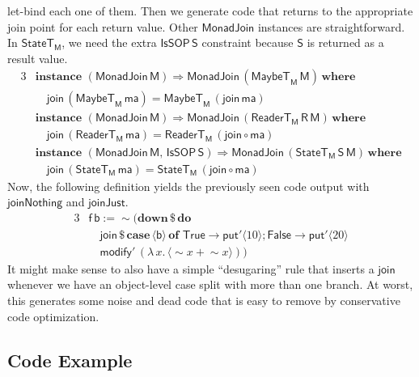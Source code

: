\documentclass[acmsmall,screen]{acmart}
\newcommand{\mit}[1]{{\mathsf{#1}}}
\newcommand{\msf}[1]{{\mathsf{#1}}}
\newcommand{\mbf}[1]{{\mathbf{#1}}}
\newcommand{\bs}[1]{\boldsymbol{#1}}
\newcommand{\mdo}{\mbf{do}\,}
\newcommand{\ind}{\hspace{1em}}
\newcommand{\where}{\mbf{where}}
\newcommand{\M}{\msf{M}}
\newcommand{\of}{\mbf{of}\,}
\newcommand{\vma}{\mathsf{ma}}
\newcommand{\vS}{\mathsf{S}}
\newcommand{\vR}{\mathsf{R}}
\newcommand{\vM}{\mathsf{M}}
\newcommand{\vb}{\mathsf{b}}
\newcommand{\vf}{\mathsf{f}}
\newcommand{\IsSOP}{\msf{IsSOP}}
\newcommand{\ReaderT}{\msf{ReaderT}}
\newcommand{\case}{\mbf{case\,}}
\newcommand{\spl}{{\bs{\sim}}}
\newcommand{\ql}{{\bs{\langle}}}
\newcommand{\qr}{{\bs{\rangle}}}
\newcommand{\True}{\msf{True}}
\newcommand{\False}{\msf{False}}
\newcommand{\MaybeT}{\msf{MaybeT}}
\theoremstyle{remark}
\newcommand{\mdown}{\mbf{down}}
\newcommand{\instance}{\mbf{instance}\,}
\newcommand{\qt}[1]{\ql#1\qr}
\newcommand{\RA}{\Rightarrow}
\newcommand{\StateT}{\msf{StateT}}
\newcommand{\dlr}{\,\$\,}
\newcommand{\MonadJoin}{\msf{MonadJoin}}
\newcommand{\join}{\mit{join}}
\newcommand{\modify}{\mit{modify}}
\newcommand{\mput}{\mit{put}}
\begin{document}
let-bind each one of them. Then we generate code that returns to the appropriate
join point for each return value. Other $\MonadJoin$ instances are straightforward. In
$\StateT_\M$, we need the extra $\IsSOP\,\vS$ constraint because $\vS$ is returned
as a result value.
\begin{alignat*}{3}
  & \instance\,(\MonadJoin\,\vM) \RA \MonadJoin\,(\MaybeT_\M\,\vM)\,\where\\
  & \ind \join\,(\MaybeT_\M\,\vma) = \MaybeT_\M\,(\join\,\vma)\\
  & \instance\,(\MonadJoin\,\vM) \RA \MonadJoin\,(\ReaderT_\M\,\vR\,\vM)\,\where\\
  & \ind \join\,(\ReaderT_\M\,\vma) = \ReaderT_\M\,(\join \circ \vma)\\
  & \instance\,(\MonadJoin\,\vM,\,\IsSOP\,\vS) \RA \MonadJoin\,(\StateT_\M\,\vS\,\vM)\,\where\\
  & \ind \join\,(\StateT_\M\,\vma) = \StateT_\M\,(\join \circ \vma)
\end{alignat*}
Now, the following definition yields the previously seen code output with
$\msf{joinNothing}$ and $\msf{joinJust}$.
\begin{alignat*}{3}
  & \vf\,\vb := \spl(\mdown \dlr \mdo \\
  & \ind \join \dlr \case \qt{\vb}\,\of\,\True\to \mput' \qt{10}; \False \to \mput' \qt{20}\\
  & \ind\modify'\,(\lambda\,x.\,\qt{\spl x + \spl x}))
\end{alignat*}
It might make sense to also have a simple ``desugaring'' rule that inserts a
$\join$ whenever we have an object-level case split with more than one branch. At
worst, this generates some noise and dead code that is easy to remove by
conservative code optimization.

\subsection{Code Example}
\end{document}
